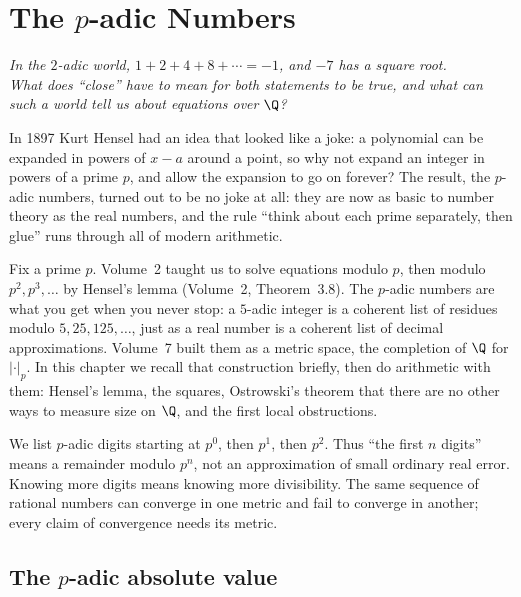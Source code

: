 \chapter{The \texorpdfstring{$p$}{p}-adic Numbers}\label{ch:padic}

\begin{center}\itshape
In the $2$-adic world, $1+2+4+8+\cdots=-1$, and $-7$ has a square root.\\
What does ``close'' have to mean for both statements to be true, and what can such a world tell us about equations over $\Q$?
\end{center}

In 1897 Kurt Hensel had an idea that looked like a joke: a polynomial can be expanded in powers of $x-a$ around a point, so why not expand an integer in
powers of a prime $p$, and allow the expansion to go on forever? The result, the $p$-adic numbers, turned out to be no joke at all: they are now as basic
to number theory as the real numbers, and the rule ``think about each prime separately, then glue'' runs through all of modern arithmetic.

Fix a prime $p$. Volume~2 taught us to solve equations modulo $p$, then modulo $p^2,p^3,\dots$ by Hensel's lemma (Volume~2, Theorem~3.8). The $p$-adic numbers are what you get when you never stop: a $5$-adic integer is a coherent list of residues modulo $5,25,125,\dots$, just as a real number is a coherent list of decimal approximations. Volume~7 built them as a metric space, the completion of $\Q$ for $|\cdot|_p$. In this chapter we recall that construction briefly, then do arithmetic with them: Hensel's lemma, the squares, Ostrowski's theorem that there are no other ways to measure size on $\Q$, and the first local obstructions.

\begin{reminder}
We list $p$-adic digits starting at $p^0$, then $p^1$, then $p^2$.
Thus ``the first $n$ digits'' means a remainder modulo $p^n$, not an
approximation of small ordinary real error. Knowing more digits means knowing
more divisibility. The same sequence of rational numbers can converge in one metric and
fail to converge in another; every claim of convergence needs its metric.
\end{reminder}

\section{The \texorpdfstring{$p$}{p}-adic absolute value}

